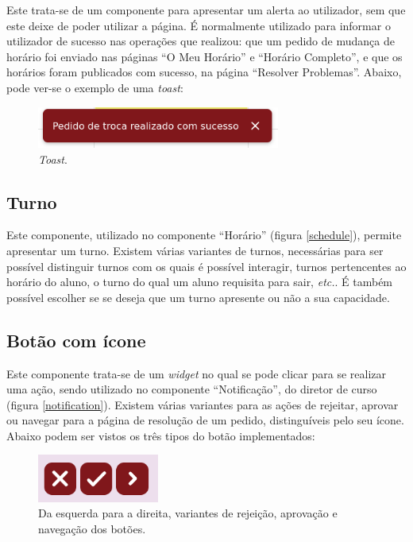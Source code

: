\documentclass[12pt, a4paper]{article}
\begin{document}
Este trata-se de um componente para apresentar um alerta ao utilizador, sem que este deixe de poder
utilizar a página. É normalmente utilizado para informar o utilizador de sucesso nas operações que
realizou: que um pedido de mudança de horário foi enviado nas páginas ``O Meu Horário'' e
``Horário Completo'', e que os horários foram publicados com sucesso, na página
``Resolver Problemas''. Abaixo, pode ver-se o exemplo de uma \emph{toast}:

\begin{figure}[H]
    \centering
    \includegraphics[width=8cm]{res/components/toast.png}
    \caption{\emph{Toast}.}
    \label{toast}
\end{figure}

\subsection{Turno}

Este componente, utilizado no componente ``Horário'' (figura \ref{schedule}), permite apresentar um
turno. Existem várias variantes de turnos, necessárias para ser possível distinguir turnos com os
quais é possível interagir, turnos pertencentes ao horário do aluno, o turno do qual um aluno
requisita para sair, \emph{etc.}. É também possível escolher se se deseja que um turno apresente ou
não a sua capacidade.

\subsection{Botão com ícone}

Este componente trata-se de um \emph{widget} no qual se pode clicar para se realizar uma ação,
sendo utilizado no componente ``Notificação'', do diretor de curso (figura \ref{notification}).
Existem várias variantes para as ações de rejeitar, aprovar ou navegar para a página de resolução
de um pedido, distinguíveis pelo seu ícone. Abaixo podem ser vistos os três tipos do botão
implementados:

\begin{figure}[H]
    \centering
    \includegraphics[width=4cm]{res/components/icon-button.png}
    \caption{Da esquerda para a direita, variantes de rejeição, aprovação e navegação dos botões.}
    \label{icon-button}
\end{figure}
\end{document}
